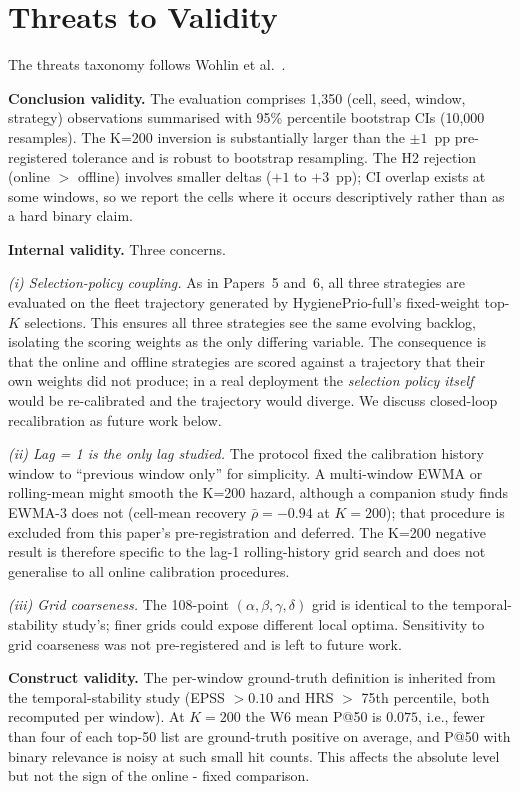 \section{Threats to Validity}
\label{sec:threats}

The threats taxonomy follows Wohlin et al.~\cite{wohlin2012experimentation}.

\textbf{Conclusion validity.} The evaluation comprises 1{,}350
(cell, seed, window, strategy) observations summarised with 95\%
percentile bootstrap CIs (10{,}000 resamples). The K=200 inversion is
substantially larger than the $\pm 1$~pp pre-registered tolerance and
is robust to bootstrap resampling. The H2 rejection (online $>$
offline) involves smaller deltas ($+1$ to $+3$~pp); CI overlap exists
at some windows, so we report the cells where it occurs descriptively
rather than as a hard binary claim.

\textbf{Internal validity.} Three concerns.

\textit{(i) Selection-policy coupling.} As in Papers~5 and~6, all
three strategies are evaluated on the fleet trajectory generated by
HygienePrio-full's \textsf{fixed}-weight top-$K$ selections. This
ensures all three strategies see the same evolving backlog, isolating
the scoring weights as the only differing variable. The consequence is
that the online and offline strategies are scored against a trajectory
that their own weights did not produce; in a real deployment the
\textit{selection policy itself} would be re-calibrated and the
trajectory would diverge. We discuss closed-loop recalibration as
future work below.

\textit{(ii) Lag = 1 is the only lag studied.} The protocol fixed the
calibration history window to ``previous window only'' for simplicity.
A multi-window EWMA or rolling-mean might smooth the K=200 hazard,
although a companion study finds EWMA-3 does not (cell-mean recovery
$\bar{\rho} = -0.94$ at $K = 200$);
that procedure is excluded from this paper's pre-registration and
deferred. The K=200 negative result is therefore specific to the
lag-1 rolling-history grid search and does not generalise to all
online calibration procedures.

\textit{(iii) Grid coarseness.} The 108-point $(\alpha, \beta, \gamma,
\delta)$ grid is identical to the temporal-stability study's; finer grids could expose
different local optima. Sensitivity to grid coarseness was not
pre-registered and is left to future work.

\textbf{Construct validity.} The per-window ground-truth definition is
inherited from the temporal-stability study (EPSS $> 0.10$ and HRS $>$ 75th percentile,
both recomputed per window). At $K = 200$ the W6 mean P@50 is
$0.075$, i.e., fewer than four of each top-50 list are ground-truth
positive on average, and P@50 with binary relevance is noisy at such
small hit counts. This affects the absolute level but not the sign of the
\textsf{online} - \textsf{fixed} comparison.

